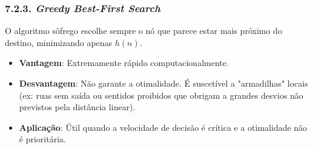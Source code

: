 \documentclass[a4paper]{article}
\begin{document}
\subsubsection*{7.2.3. \textit{Greedy Best-First Search}}
\noindent O algoritmo sôfrego escolhe sempre o nó que parece estar mais próximo do destino, minimizando apenas $h(n)$.
\begin{itemize}
    \item \textbf{Vantagem}: Extremamente rápido computacionalmente.
    \item \textbf{Desvantagem}: Não garante a otimalidade. É suscetível a "armadilhas" locais (ex: ruas sem saída ou sentidos proibidos que obrigam a grandes desvios não previstos pela distância linear).
    \item \textbf{Aplicação}: Útil quando a velocidade de decisão é crítica e a otimalidade não é prioritária.
\end{itemize}
\end{document}

